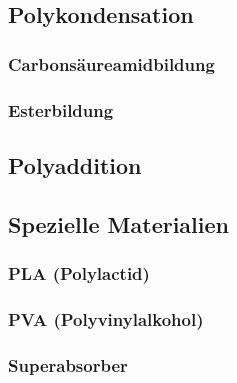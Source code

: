 \subsection{Polykondensation}


\subsubsection{Carbonsäureamidbildung}


\subsubsection{Esterbildung}


\subsection{Polyaddition}


\subsection{Spezielle Materialien}


\subsubsection{PLA (Polylactid)}

\subsubsection{PVA (Polyvinylalkohol)}

\subsubsection{Superabsorber}

